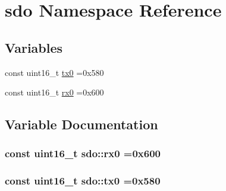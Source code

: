\hypertarget{namespacesdo}{}\section{sdo Namespace Reference}
\label{namespacesdo}
\subsection*{Variables}
\begin{DoxyCompactItemize}
\item 
const uint16\+\_\+t \hyperlink{namespacesdo_ada4eb9ed2535da14a1b4c449b52c98b6}{tx0} =0x580
\item 
const uint16\+\_\+t \hyperlink{namespacesdo_a32e87699bc0a4deed591fb38703c48f2}{rx0} =0x600
\end{DoxyCompactItemize}


\subsection{Variable Documentation}
\subsubsection[{\texorpdfstring{rx0}{rx0}}]{\setlength{\rightskip}{0pt plus 5cm}const uint16\+\_\+t sdo\+::rx0 =0x600}\hypertarget{namespacesdo_a32e87699bc0a4deed591fb38703c48f2}{}\label{namespacesdo_a32e87699bc0a4deed591fb38703c48f2}
\subsubsection[{\texorpdfstring{tx0}{tx0}}]{\setlength{\rightskip}{0pt plus 5cm}const uint16\+\_\+t sdo\+::tx0 =0x580}\hypertarget{namespacesdo_ada4eb9ed2535da14a1b4c449b52c98b6}{}\label{namespacesdo_ada4eb9ed2535da14a1b4c449b52c98b6}
